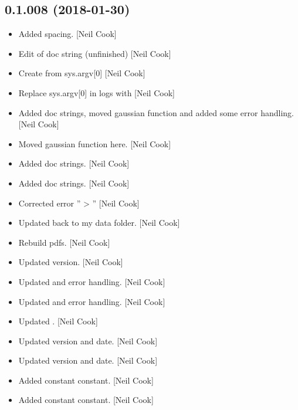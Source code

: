 \documentclass[a4paper,10pt,english]{report}
\begin{document}
\subsection{0.1.008 (2018-01-30)}
\label{\detokenize{misc/changelog:id495}}\begin{itemize}
\item {} 
Added spacing. {[}Neil Cook{]}

\item {} 
Edit of doc string (unfinished) {[}Neil Cook{]}

\item {} 
Create  from sys.argv{[}0{]} {[}Neil Cook{]}

\item {} 
Replace sys.argv{[}0{]} in logs with
 {[}Neil Cook{]}

\item {} 
Added doc strings, moved gaussian function and added some error
handling. {[}Neil Cook{]}

\item {} 
Moved gaussian function here. {[}Neil Cook{]}

\item {} 
Added doc strings. {[}Neil Cook{]}

\item {} 
Added doc strings. {[}Neil Cook{]}

\item {} 
Corrected error ” \textendash{}\textgreater{} ” {[}Neil Cook{]}

\item {} 
Updated back to my data folder. {[}Neil Cook{]}

\item {} 
Rebuild pdfs. {[}Neil Cook{]}

\item {} 
Updated version. {[}Neil Cook{]}

\item {} 
Updated  and error handling. {[}Neil Cook{]}

\item {} 
Updated  and error handling. {[}Neil Cook{]}

\item {} 
Updated . {[}Neil Cook{]}

\item {} 
Updated version and date. {[}Neil Cook{]}

\item {} 
Updated version and date. {[}Neil Cook{]}

\item {} 
Added  constant constant. {[}Neil Cook{]}

\item {} 
Added  constant constant. {[}Neil Cook{]}

\end{itemize}
\end{document}
